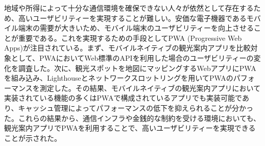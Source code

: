 地域や所得によって十分な通信環境を確保できない人々が依然として存在するため、高いユーザビリティーを実現することが難しい。安価な電子機器であるモバイル端末の需要が大きいため、モバイル端末のユーザビリティーを向上させることが重要である。これを実現するための手段としてPWA (Progressive Web Apps)が注目されている。まず、モバイルネイティブの観光案内アプリを比較対象として、PWAにおいてWeb標準のAPIを利用した場合のユーザビリティーの変化を調査した。次に、観光スポットを地図にマッピングするWebアプリにPWAを組み込み、Lighthouseとネットワークスロットリングを用いてPWAのパフォーマンスを測定した。その結果、モバイルネイティブの観光案内アプリにおいて実装されている機能の多くはPWAで構成されているアプリでも実装可能であり、キャッシュ管理によってパフォーマンスの低下を抑えられることが分かった。これらの結果から、通信インフラや金銭的な制約を受ける環境においても、観光案内アプリでPWAを利用することで、高いユーザビリティーを実現できることが示された。